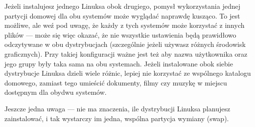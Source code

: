 Jeżeli instalujesz jednego Linuksa obok drugiego, pomysł wykorzystania jednej partycji domowej dla obu systemów może wyglądać naprawdę kusząco. To jest możliwe, ale weź pod uwagę, że każdy z tych systemów może korzystać z innych plików --- może się więc okazać, że nie wszystkie ustawienia będą prawidłowo odczytywane w obu dystrybucjach (szczególnie jeżeli używasz różnych środowisk graficznych). Przy takiej konfiguracji ważne jest też aby nazwa użytkownika oraz jego grupy były taka sama na obu systemach. Jeżeli instalowane obok siebie dystrybucje Linuksa dzieli wiele różnic, lepiej nie korzystać ze wspólnego katalogu domowego, zamiast tego umieścić dokumenty, filmy czy muzykę w miejscu dostępnym dla obydwu systemów.

Jeszcze jedna uwaga --- nie ma znaczenia, ile dystrybucji Linuksa planujesz zainstalować, i tak wystarczy im jedna, wspólna partycja wymiany (swap).